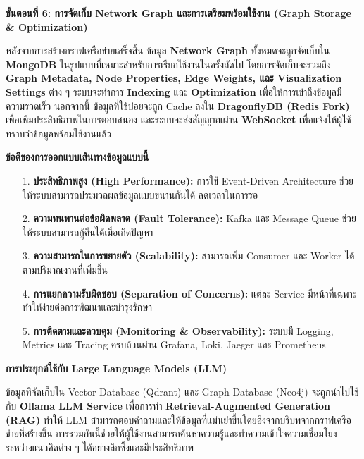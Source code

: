 \documentclass[12pt,a4paper]{article}
\begin{document}
\begin{enumerate}[leftmargin=2cm]
\begin{enumerate}
{            \vspace{0.3cm}

            \textbf{ขั้นตอนที่ 6: การจัดเก็บ Network Graph และการเตรียมพร้อมใช้งาน (Graph Storage \& Optimization)}

            \hspace{1cm}หลังจากการสร้างกราฟเครือข่ายเสร็จสิ้น ข้อมูล \textbf{Network Graph} ทั้งหมดจะถูกจัดเก็บใน \textbf{MongoDB} ในรูปแบบที่เหมาะสำหรับการเรียกใช้งานในครั้งถัดไป โดยการจัดเก็บจะรวมถึง \textbf{Graph Metadata, Node Properties, Edge Weights, และ Visualization Settings} ต่าง ๆ ระบบจะทำการ \textbf{Indexing} และ \textbf{Optimization} เพื่อให้การเข้าถึงข้อมูลมีความรวดเร็ว นอกจากนี้ ข้อมูลที่ใช้บ่อยจะถูก Cache ลงใน \textbf{DragonflyDB (Redis Fork)} เพื่อเพิ่มประสิทธิภาพในการตอบสนอง และระบบจะส่งสัญญาณผ่าน \textbf{WebSocket} เพื่อแจ้งให้ผู้ใช้ทราบว่าข้อมูลพร้อมใช้งานแล้ว

            \vspace{0.5cm}

            \textbf{ข้อดีของการออกแบบเส้นทางข้อมูลแบบนี้}

            \begin{enumerate}
                \item[1.] \textbf{ประสิทธิภาพสูง (High Performance):} การใช้ Event-Driven Architecture ช่วยให้ระบบสามารถประมวลผลข้อมูลแบบขนานกันได้ ลดเวลาในการรอ
                \item[2.] \textbf{ความทนทานต่อข้อผิดพลาด (Fault Tolerance):} Kafka และ Message Queue ช่วยให้ระบบสามารถกู้คืนได้เมื่อเกิดปัญหา
                \item[3.] \textbf{ความสามารถในการขยายตัว (Scalability):} สามารถเพิ่ม Consumer และ Worker ได้ตามปริมาณงานที่เพิ่มขึ้น
                \item[4.] \textbf{การแยกความรับผิดชอบ (Separation of Concerns):} แต่ละ Service มีหน้าที่เฉพาะ ทำให้ง่ายต่อการพัฒนาและบำรุงรักษา
                \item[5.] \textbf{การติดตามและควบคุม (Monitoring \& Observability):} ระบบมี Logging, Metrics และ Tracing ครบถ้วนผ่าน Grafana, Loki, Jaeger และ Prometheus
            \end{enumerate}

            \vspace{0.7cm}

            \textbf{การประยุกต์ใช้กับ Large Language Models (LLM)}

            \hspace{1cm}ข้อมูลที่จัดเก็บใน Vector Database (Qdrant) และ Graph Database (Neo4j) จะถูกนำไปใช้กับ \textbf{Ollama LLM Service} เพื่อการทำ \textbf{Retrieval-Augmented Generation (RAG)} ทำให้ LLM สามารถตอบคำถามและให้ข้อมูลที่แม่นยำขึ้นโดยอิงจากบริบทจากกราฟเครือข่ายที่สร้างขึ้น การรวมกันนี้ช่วยให้ผู้ใช้งานสามารถค้นหาความรู้และทำความเข้าใจความเชื่อมโยงระหว่างแนวคิดต่าง ๆ ได้อย่างลึกซึ้งและมีประสิทธิภาพ
        }
    \end{enumerate}


\end{enumerate}
\end{document}
